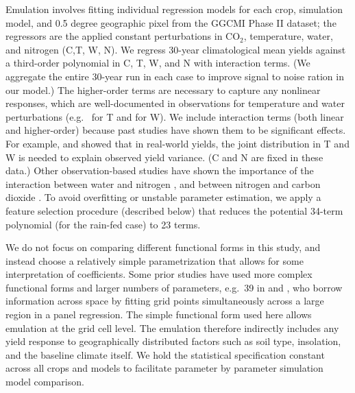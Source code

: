 \documentclass[preprint, 5p, times, twocolumn]{elsarticle}
\begin{document}
Emulation involves fitting individual regression models for each crop, simulation model, and 0.5 degree geographic pixel from the GGCMI Phase II dataset; the regressors are the applied constant perturbations in CO$_2$, temperature, water, and nitrogen (C,T, W, N).  We regress 30-year climatological mean yields against a third-order polynomial in C, T, W, and N with interaction terms. (We aggregate the entire 30-year run in each case to improve signal to noise ration in our model.) The higher-order terms are necessary to capture any nonlinear responses, which are well-documented in observations for temperature and water perturbations (e.g.\ \citet{Schlenker2009} for T and \citet{He2016} for W). We include interaction terms (both linear and higher-order) because past studies have shown them to be significant effects. For example, \citet{Lobell2007} and \citet{Tebaldi2008} showed that in real-world yields, the joint distribution in T and W is needed to explain observed yield variance. (C and N are fixed in these data.) Other observation-based studies have shown the importance of the interaction between water and nitrogen \citep[e.g.][]{AULAKH2005}, and between nitrogen and carbon dioxide \citep{Mitsuru92, Nakamura97}. To avoid overfitting or unstable parameter estimation, we apply a feature selection procedure (described below) that reduces the potential 34-term polynomial (for the rain-fed case) to 23 terms.

We do not focus on comparing different functional forms in this study, and instead choose a relatively simple parametrization that allows for some interpretation of coefficients. Some prior studies have used more complex functional forms and larger numbers of parameters, e.g.\ 39 in \citet{BLANC2015} and \citet{BLANC2017}, who borrow information across space by fitting grid points simultaneously across a large region in a panel regression. The simple functional form used here allows emulation at the grid cell level. The emulation therefore indirectly includes any yield response to geographically distributed factors such as soil type, insolation, and the baseline climate itself. We hold the statistical specification constant across all crops and models to facilitate parameter by parameter simulation model comparison.
\end{document}
